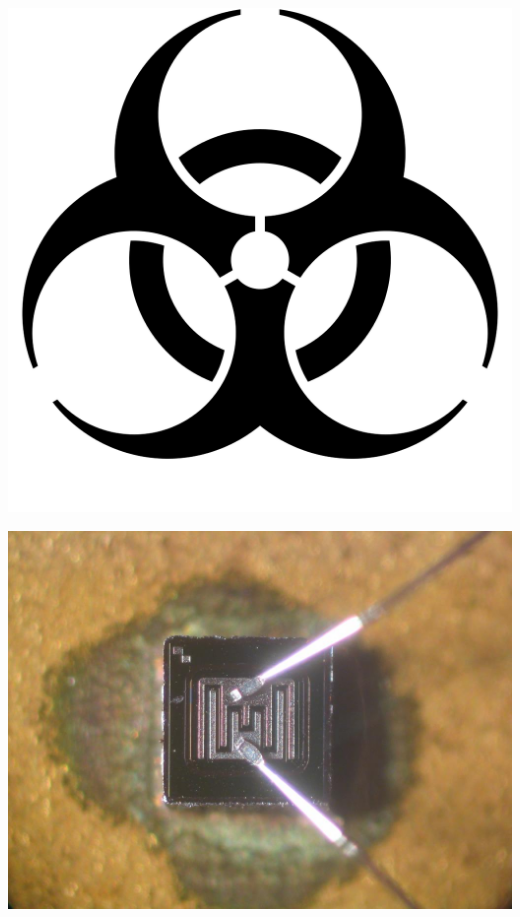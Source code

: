 {
\begin{center}
\includegraphics[scale=0.5]{svg/biohazard}
\end{center}
}


\slide{} %
{
\begin{center}
\includegraphics[scale=0.33]{pic/transistor}
\end{center}
}


